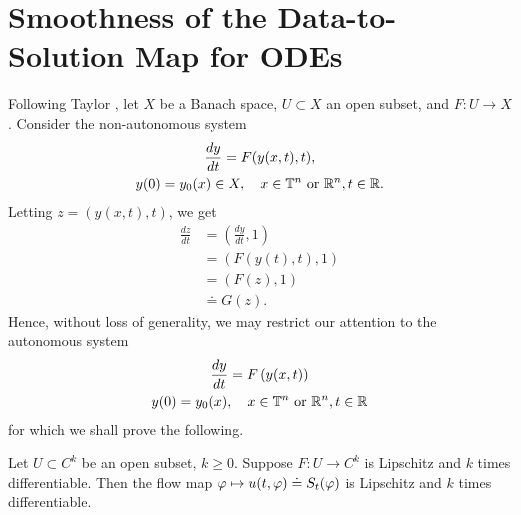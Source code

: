 \section{Smoothness of the Data-to-Solution Map for ODEs} 
\label{sec:dep-param-smooth}
%
%
Following Taylor \cite{Taylor:1995kx}, let $X$ be a Banach space, $U \subset X$ an open subset, and $F: U \to X$. Consider the non-autonomous system
%
%
\begin{gather}
  \label{aa-sm}
\frac{dy}{dt} = F(y(x,t), t),
\\
y(0)= y_{0}(x) \in X, \quad x \in \mathbb{T}^{n} \ \text{or} \ \mathbb{R}^{n},t \in \mathbb{R}.
\label{bb-sm}
\end{gather}
%
Letting $z = (y(x,t), t)$, we get
%
%
\begin{equation*}
\begin{split}
\frac{dz}{dt}  
& = \left (\frac{dy}{dt}, 1 \right )
\\
& = \left( F(y(t), t), 1 \right)
\\
& = \left( F(z), 1 \right)
\\
& \doteq G(z).
\end{split}
\end{equation*}
%
%
Hence, without loss of generality, we may restrict our attention to the
autonomous system
%
%
\begin{gather}
\frac{dy}{dt} = F\left( y(x,t) \right)
\label{ode-eq-sm}
\\
y(0) = y_{0}(x), \quad x \in \mathbb{T}^{n} \ \text{or} \ \mathbb{R}^{n},t \in \mathbb{R}
\label{ode-init-data-sm}
\end{gather}
%
%
%
for which we shall prove the following.
%
%
%
%
%
%
%
%
\begin{proposition}
  Let $U \subset C^{k}$ be an open subset, $k \ge 0$. Suppose
  $F: U \to C^{k}$ is Lipschitz and $k$ times differentiable. 
  Then the flow map $\varphi \mapsto u(t, \varphi) \doteq S_{t}(\varphi)$ is Lipschitz and
  $k$ times differentiable.
  \label{prop:reg-result}
\end{proposition}
%
%
%
%
